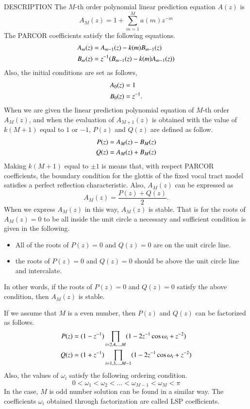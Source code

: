 \begin{qsection}{DESCRIPTION}
The $M$-th order polynomial linear prediction equation $A(z)$ is
\begin{displaymath}
  A_M(z) = 1 + \sum_{m=1}^M a(m) z^{-m}
\end{displaymath}
The PARCOR coefficients satisfy the following equations.
\begin{align}
  A_m(z) &= A_{m-1}(z) - k(m) B_{m-1}(z) \notag \\
  B_m(z) &= z^{-1} (B_{m-1}(z) - k(m) A_{m-1}(z)) \notag
\end{align}
Also, the initial conditions are set as follows,
\begin{align}
  A_0(z) &= 1 \notag \\
  B_0(z) &= z^{-1}.
\end{align}
When we are given the linear prediction polynomial equation
of $M$-th order $A_M(z)$, and when the evaluation of $A_{M+1}(z)$
is obtained with the value of $k(M+1)$ equal to $1$ or $-1$, 
$P(z)$ and $Q(z)$ are defined as follow.
\begin{align}
  P(z) &= A_M(z) - B_M(z) \notag \\
  Q(z) &= A_M(z) + B_M(z) \notag
\end{align}
Making $k(M+1)$ equal to $\pm 1$ is means that,
with respect PARCOR coefficients,
the boundary condition for the glottis of the fixed vocal tract model
satisfies a perfect reflection characteristic.
Also, $A_M(z)$ can be expressed as
\begin{displaymath}
  A_M(z) =  \frac{P(z) + Q(z)}{2}.
\end{displaymath}
When we express $A_M(z)$ in this way,
$A_M(z)$ is stable.
That is for the roots of $A_M(z)=0$ to be all inside
the unit circle a necessary and sufficient condition is given
in the following.
\begin{itemize}
\item All of the roots of $P(z)=0$ and $Q(z)=0$ are on the unit circle
      line.
\item the roots of $P(z)=0$ and $Q(z)=0$ should be above the unit
      circle line and intercalate.
\end{itemize}
In other words, if  the roots of $P(z)=0$ and $Q(z)=0$ satisfy the
above condition, then $A_M(z)$ is stable.
\par
If we assume that $M$ is a even number, then
$P(z)$ and $Q(z)$ can be factorized as follows.
\begin{align}
  P(z) &= ( 1 - z^{-1} ) \prod_{i=2,4,\dots,M}
          ( 1 - 2 z^{-1} \cos \omega_i + z^{-2} ) \notag \\
  Q(z) &= ( 1 + z^{-1} ) \prod_{i=1,3,\dots,M-1}
          ( 1 - 2 z^{-1} \cos \omega_i + z^{-2} ) \notag
\end{align}
Also, the values of $\omega_i$ satisfy the following ordering condition.
\begin{displaymath}
  0 < \omega_1 < \omega_2 < \dots < \omega_{M-1} < \omega_M < \pi
\end{displaymath}
In the case, $M$ is odd number solution can be found in a similar way.
The coefficients $\omega_i$ obtained through factorization are called
LSP coefficients.
\end{qsection}

